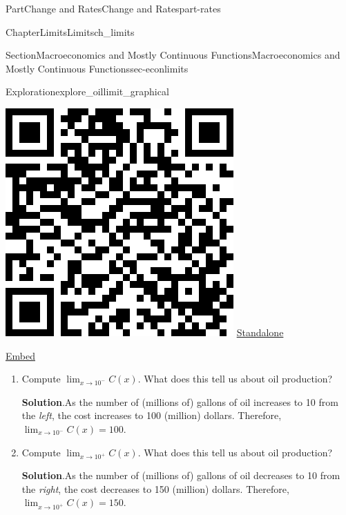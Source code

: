\documentclass[oneside,10pt,]{tufte-book}
\newcommand{\blocktitlefont}{\relax}
\numberwithin{equation}{chapter}
\begin{document}
\begin{partptx}{Part}{Change and Rates}{}{Change and Rates}{}{}{part-rates}
\begin{chapterptx}{Chapter}{Limits}{}{Limits}{}{}{ch_limits}
\begin{sectionptx}{Section}{Macroeconomics and Mostly Continuous Functions}{}{Macroeconomics and Mostly Continuous Functions}{}{}{sec-econlimits}
\begin{exploration}{Exploration}{}{explore_oillimit_graphical}
\begin{sidebyside}{2}{0.075}{0.075}{0.17}
\begin{sbspanel}{0.21}
\includegraphics[width=\linewidth]{generated/qrcode/explore_oillimit_graphical-1-2.png}
\href{http://webwork.bridgew.edu/oer/functions_at_work/explore_oillimit_graphical-1-2.html}{Standalone}%
\par
\href{http://webwork.bridgew.edu/oer/functions_at_work/explore_oillimit_graphical-1-2-if.html}{Embed}%
\end{sbspanel}%
\end{sidebyside}%
\begin{enumerate}[font=\bfseries,label=(\alph*),ref=\alph*]%
\item{}Compute \(\lim_{x\rightarrow 10^-}C(x).\) What does this tell us about oil production?%
\par\smallskip%
\noindent\textbf{\blocktitlefont Solution}.\hypertarget{explore_oillimit_graphical-2-2}{}\quad{}As the number of (millions of) gallons of oil increases to 10 from the \emph{left}, the cost increases to \textdollar{}100 (million) dollars. Therefore,   \(\lim_{x\rightarrow 10^-}C(x)= 100.\)%
\item{}Compute \(\lim_{x\rightarrow 10^+}C(x).\) What does this tell us about oil production?%
\par\smallskip%
\noindent\textbf{\blocktitlefont Solution}.\hypertarget{explore_oillimit_graphical-3-2}{}\quad{}As the number of (millions of) gallons of oil decreases to 10 from the \emph{right}, the cost decreases to \textdollar{}150 (million) dollars. Therefore,   \(\lim_{x\rightarrow 10^+}C(x)= 150.\)%

\end{enumerate}
\end{exploration}
\end{sectionptx}
\end{chapterptx}
\end{partptx}
\end{document}
